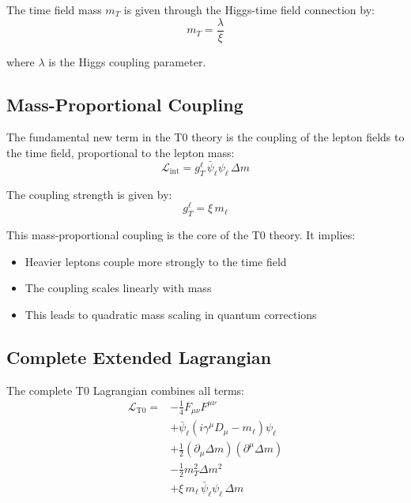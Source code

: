 	The time field mass $m_T$ is given through the Higgs-time field connection by:
	\begin{equation}
		m_T = \frac{\lambda}{\xi}
		\label{eq:time_field_mass_value}
	\end{equation}
	
	where $\lambda$ is the Higgs coupling parameter.
	
	\subsection{Mass-Proportional Coupling}
	
	The fundamental new term in the T0 theory is the coupling of the lepton fields to the time field, proportional to the lepton mass:
	\begin{equation}
		\mathcal{L}_{\text{int}} = g_T^\ell \, \bar{\psi}_\ell \psi_\ell \, \Delta m
		\label{eq:interaction_term}
	\end{equation}
	
	The coupling strength is given by:
	\begin{equation}
		\boxed{g_T^\ell = \xi \, m_\ell}
		\label{eq:coupling_strength}
	\end{equation}
	
	This mass-proportional coupling is the core of the T0 theory. It implies:
	\begin{itemize}
		\item Heavier leptons couple more strongly to the time field
		\item The coupling scales linearly with mass
		\item This leads to quadratic mass scaling in quantum corrections
	\end{itemize}
	
	\subsection{Complete Extended Lagrangian}
	
	The complete T0 Lagrangian combines all terms:
	\begin{equation}
		\begin{split}
			\mathcal{L}_{\text{T0}} = &-\frac{1}{4} F_{\mu\nu}F^{\mu\nu} \\
			&+ \bar{\psi}_\ell(i\gamma^\mu D_\mu - m_\ell)\psi_\ell \\
			&+ \frac{1}{2}(\partial_\mu \Delta m)(\partial^\mu \Delta m) \\
			&- \frac{1}{2} m_T^2 \Delta m^2 \\
			&+ \xi \, m_\ell \,\bar{\psi}_\ell \psi_\ell \, \Delta m
		\end{split}
		\label{eq:full_lagrangian}
	\end{equation}
	
